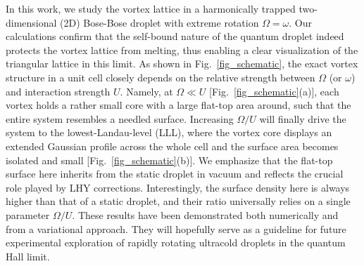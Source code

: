 \documentclass[reprint,aps,pra,twocolumn,superscriptaddress]{revtex4-1}
\begin{document}
In this work, we study the vortex lattice in a harmonically trapped two-dimensional (2D) Bose-Bose droplet with extreme rotation $\Omega=\omega$. Our calculations confirm that %
the self-bound nature of the quantum droplet indeed protects the vortex lattice from melting, thus enabling a clear visualization of the triangular lattice in this limit. As shown in Fig.~\ref{fig_schematic}, the exact vortex structure in a unit cell closely depends on the relative strength between $\Omega$ (or $\omega$) and interaction strength $U$. Namely, at $\Omega\ll U$ [Fig.~\ref{fig_schematic}(a)], each vortex holds a rather small core with a large flat-top area around, such that the entire system resembles a needled surface. Increasing $\Omega/U$ will finally drive the system to the lowest-Landau-level (LLL), where the vortex core displays an extended Gaussian profile across the whole cell and the surface area becomes isolated and small [Fig.~\ref{fig_schematic}(b)].
We emphasize that the flat-top surface here %
inherits from the static droplet in vacuum and  reflects the crucial role played by LHY corrections. %
Interestingly, the surface density here is always higher than that of a static droplet, and their ratio universally relies on a single parameter $\Omega/U$. These results have been demonstrated both numerically and from a variational approach. They will hopefully serve as a guideline for  future
experimental exploration of rapidly rotating ultracold droplets in the quantum Hall limit.
\end{document}
